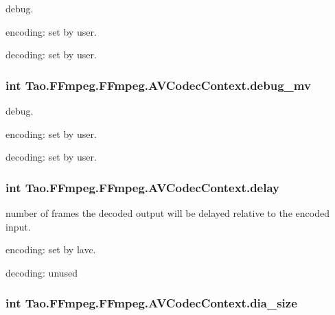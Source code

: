 \label{struct_tao_1_1_f_fmpeg_1_1_f_fmpeg_1_1_a_v_codec_context_a208361fed669cdcef53b7d362f927360}
debug.
\begin{DoxyItemize}
\item encoding: set by user.
\item decoding: set by user. 
\end{DoxyItemize}\hypertarget{struct_tao_1_1_f_fmpeg_1_1_f_fmpeg_1_1_a_v_codec_context_ae213d6275d67691d92a6b2e8016eb9b1}{
\subsubsection[{debug\_\-mv}]{\setlength{\rightskip}{0pt plus 5cm}int {\bf Tao.FFmpeg.FFmpeg.AVCodecContext.debug\_\-mv}}}
\label{struct_tao_1_1_f_fmpeg_1_1_f_fmpeg_1_1_a_v_codec_context_ae213d6275d67691d92a6b2e8016eb9b1}
debug.
\begin{DoxyItemize}
\item encoding: set by user.
\item decoding: set by user. 
\end{DoxyItemize}\hypertarget{struct_tao_1_1_f_fmpeg_1_1_f_fmpeg_1_1_a_v_codec_context_a0c477477858ef49485a27194f18c14d8}{
\subsubsection[{delay}]{\setlength{\rightskip}{0pt plus 5cm}int {\bf Tao.FFmpeg.FFmpeg.AVCodecContext.delay}}}
\label{struct_tao_1_1_f_fmpeg_1_1_f_fmpeg_1_1_a_v_codec_context_a0c477477858ef49485a27194f18c14d8}
number of frames the decoded output will be delayed relative to the encoded input.
\begin{DoxyItemize}
\item encoding: set by lavc.
\item decoding: unused 
\end{DoxyItemize}\hypertarget{struct_tao_1_1_f_fmpeg_1_1_f_fmpeg_1_1_a_v_codec_context_ac1e7fe9512c33818fadd9d52e801f224}{
\subsubsection[{dia\_\-size}]{\setlength{\rightskip}{0pt plus 5cm}int {\bf Tao.FFmpeg.FFmpeg.AVCodecContext.dia\_\-size}}}
